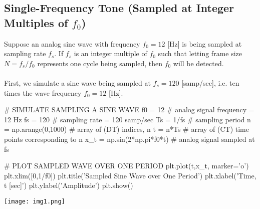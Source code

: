 \documentclass{report}
\begin{document}
\subsection{Single-Frequency Tone (Sampled at Integer Multiples of $f_0$)}
Suppose an analog sine wave with frequency $f_0 = 12$ [Hz] is being sampled at sampling rate $f_s$. If $f_s$ is an integer multiple 
of $f_0$ such that letting frame size $N=f_s/f_0$ represents one cycle being sampled, then $f_0$ will be detected.
\\ \\
First, we simulate a sine wave being sampled at $f_s=120$ [samp/sec], i.e. ten times the wave frequency $f_0=12$ [Hz].
\begin{python}
# SIMULATE SAMPLING A SINE WAVE
f0 = 12                    # analog signal frequency = 12 Hz
fs = 120                   # sampling rate = 120 samp/sec
Ts = 1/fs                  # sampling period
n = np.arange(0,1000)      # array of (DT) indices, n
t = n*Ts                   # array of (CT) time points corresponding to n
x_t = np.sin(2*np.pi*f0*t) # analog signal sampled at fs

# PLOT SAMPLED WAVE OVER ONE PERIOD
plt.plot(t,x_t, marker='o')
plt.xlim([0,1/f0])
plt.title('Sampled Sine Wave over One Period')
plt.xlabel('Time, t [sec]')
plt.ylabel('Amplitude')
plt.show()
\end{python}
\texttt{[image: img1.png]}
\end{document}
